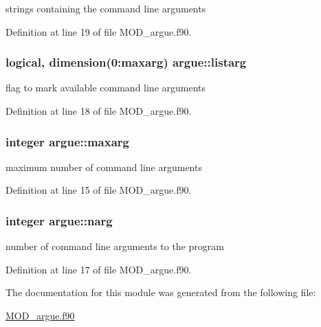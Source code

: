 strings containing the command line arguments 



Definition at line 19 of file M\-O\-D\-\_\-argue.\-f90.

\hypertarget{classargue_a978200cf4ce618c6681ea64c7203b3ea}{
\subsubsection[{listarg}]{\setlength{\rightskip}{0pt plus 5cm}logical, dimension(0\-:{\bf maxarg}) argue\-::listarg}}\label{classargue_a978200cf4ce618c6681ea64c7203b3ea}


flag to mark available command line arguments 



Definition at line 18 of file M\-O\-D\-\_\-argue.\-f90.

\hypertarget{classargue_a9f728a4838a5af0e2a9763f9b627447a}{
\subsubsection[{maxarg}]{\setlength{\rightskip}{0pt plus 5cm}integer argue\-::maxarg}}\label{classargue_a9f728a4838a5af0e2a9763f9b627447a}


maximum number of command line arguments 



Definition at line 15 of file M\-O\-D\-\_\-argue.\-f90.

\hypertarget{classargue_a9ae8afb4911a2aa1af3126c1e5e037f5}{
\subsubsection[{narg}]{\setlength{\rightskip}{0pt plus 5cm}integer argue\-::narg}}\label{classargue_a9ae8afb4911a2aa1af3126c1e5e037f5}


number of command line arguments to the program 



Definition at line 17 of file M\-O\-D\-\_\-argue.\-f90.



The documentation for this module was generated from the following file\-:\begin{DoxyCompactItemize}
\item 
\hyperlink{MOD__argue_8f90}{M\-O\-D\-\_\-argue.\-f90}\end{DoxyCompactItemize}
